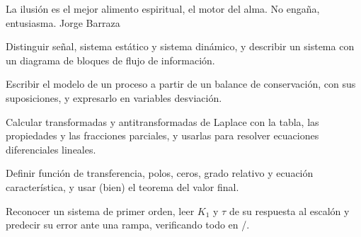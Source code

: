 
  {La ilusión es el mejor alimento espiritual, el motor del alma. No engaña, entusiasma.}
  {Jorge Barraza}

\begin{objetivos}
  \item Distinguir señal, sistema estático y sistema dinámico, y describir un sistema con un diagrama de bloques de flujo de información.
  \item Escribir el modelo de un proceso a partir de un balance de conservación, con sus suposiciones, y expresarlo en variables desviación.
  \item Calcular transformadas y antitransformadas de Laplace con la tabla, las propiedades y las fracciones parciales, y usarlas para resolver ecuaciones diferenciales lineales.
  \item Definir función de transferencia, polos, ceros, grado relativo y ecuación característica, y usar (bien) el teorema del valor final.
  \item Reconocer un sistema de primer orden, leer $K_1$ y $\tau$ de su respuesta al escalón y predecir su error ante una rampa, verificando todo en \matlab/\simulink.
\end{objetivos}










